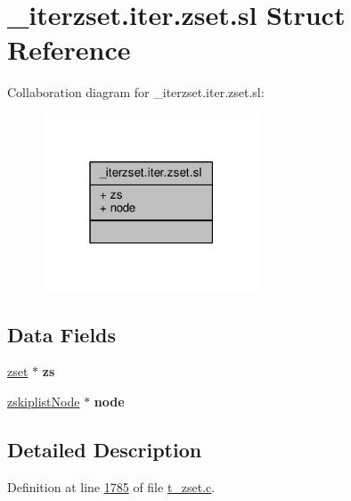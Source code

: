 \hypertarget{structzsetopsrc_1_1__iterzset_8iter_8zset_8sl}{}\section{\+\_\+iterzset.\+iter.\+zset.\+sl Struct Reference}
\label{structzsetopsrc_1_1__iterzset_8iter_8zset_8sl}


Collaboration diagram for \+\_\+iterzset.\+iter.\+zset.\+sl\+:\nopagebreak
\begin{figure}[H]
\begin{center}
\leavevmode
\includegraphics[width=183pt]{structzsetopsrc_1_1__iterzset_8iter_8zset_8sl__coll__graph}
\end{center}
\end{figure}
\subsection*{Data Fields}
\begin{DoxyCompactItemize}
\item 
\mbox{\label{structzsetopsrc_1_1__iterzset_8iter_8zset_8sl_af6706d5db3ad094cfabd8fb5326f1eec}} 
\hyperlink{structzset}{zset} $\ast$ {\bfseries zs}
\item 
\mbox{\label{structzsetopsrc_1_1__iterzset_8iter_8zset_8sl_a36c4536996ca5615dcf9911f068786dc}} 
\hyperlink{structzskiplistNode}{zskiplist\+Node} $\ast$ {\bfseries node}
\end{DoxyCompactItemize}


\subsection{Detailed Description}


Definition at line \hyperlink{t__zset_8c_source_l01785}{1785} of file \hyperlink{t__zset_8c_source}{t\+\_\+zset.\+c}.



